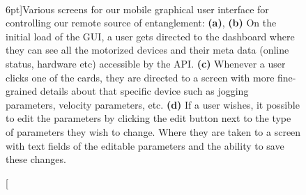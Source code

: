 \begin{figure}
	 \\
	\caption[Various screens for our mobile graphical user interface for modifying the settings on the motorized devices in our experiments.][6pt]{Various screens for our mobile graphical user interface for controlling our remote source of entanglement: \textbf{(a)},  \textbf{(b)} On the initial load of the GUI, a user gets directed to the dashboard where they can see all the motorized devices and their meta data (online status, hardware etc) accessible by the API. \textbf{(c)} Whenever a user clicks one of the cards, they are directed to a screen with more fine-grained details about that specific device such as jogging parameters, velocity parameters, etc. \textbf{(d)} If a user wishes, it possible to edit the parameters by clicking the edit button next to the type of parameters they wish to change. Where they are taken to a screen with text fields of the editable parameters and the ability to save these changes.} 
\end{figure}

